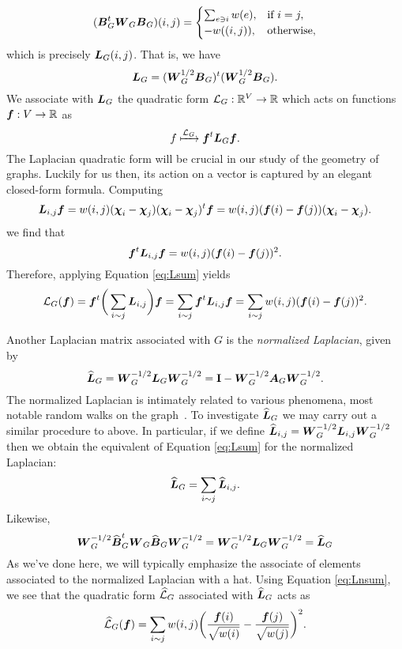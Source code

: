 \begin{align*}
(\vb*{B}_G^t\vb*{W}_G\vb*{B}_G)(i,j) = 
\begin{cases}
\sum_{e\ni i} w(e),&\text{if } i=j,\\
-w((i,j)),&\text{otherwise}, 
\end{cases}
\end{align*}
which is precisely $\vb*{L}_G(i,j)$. That is, we have 
 \begin{equation}
 \label{eq:L=BTB}
 \vb*{L}_G=(\vb*{W}_G^{1/2}\vb*{B}_G)^t(\vb*{W}_G^{1/2}\vb*{B}_G).
 \end{equation}
 We associate with $\vb*{L}_G$ the quadratic form $\mathcal{L}_G:\mathbb{R}^V\to \mathbb{R}$ which acts on functions $\vb*{f}:V\to \mathbb{R}$ as 
\begin{equation*}
 f\xmapsto{\mathcal{L}_G} \vb*{f}^t \vb*{L}_G \vb*{f}.
\end{equation*}
The Laplacian quadratic form will be crucial in our study of the geometry of graphs. Luckily for us then, its action on a vector is captured by an elegant closed-form formula. 
Computing 
\begin{equation*}
    \vb*{L}_{i,j}\vb*{f} = w(i,j)(\boldsymbol{\chi}_i -\boldsymbol{\chi}_j)(\boldsymbol{\chi}_i-\boldsymbol{\chi}_j)^t \vb*{f} = w(i,j)(\vb*{f}(i)-\vb*{f}(j))(\boldsymbol{\chi}_i-\boldsymbol{\chi}_j).
\end{equation*}
we find that 
\[\vb*{f}^t \vb*{L}_{i,j} \vb*{f} = w(i,j)(\vb*{f}(i)-\vb*{f}(j))^2.\]
Therefore, applying Equation \ref{eq:Lsum} yields 
\begin{equation}
\label{eq:Lf}
    \mathcal{L}_G(\vb*{f}) = \vb*{f}^t \bigg(\sum_{i\sim j} \vb*{L}_{i,j}\bigg) \vb*{f} = \sum_{i\sim j}\vb*{f}^t \vb*{L}_{i,j} \vb*{f}= \sum_{i\sim j} w(i,j)(\vb*{f}(i)-\vb*{f}(j))^2.
\end{equation}

Another Laplacian matrix associated with $G$ is the \emph{normalized Laplacian}, given by 
\begin{equation}
\label{eq:Ln_G}
    \widehat{\vb*{L}}_G = \vb*{W}_G^{-1/2} \vb*{L}_G\vb*{W}_G^{-1/2} = \vb{I} - \vb*{W}_G^{-1/2} \vb*{A}_G\vb*{W}_{G}^{-1/2}.
\end{equation} 
The normalized Laplacian is intimately related to various  phenomena, most notable random walks on the graph~\cite{chen2007resistance,chung1997spectral}. To investigate $\widehat{\vb*{L}}_G$ we may carry out a similar procedure to above. In particular, if we define $\widehat{\vb*{L}}_{i,j}=\vb*{W}_G^{-1/2} \vb*{L}_{i,j}\vb*{W}_G^{-1/2}$ then we obtain the equivalent of Equation \ref{eq:Lsum} for the normalized Laplacian:
\begin{equation}
\label{eq:Lnsum}
    \widehat{\vb*{L}}_G = \sum_{i\sim j}\widehat{\vb*{L}}_{i,j}.
\end{equation}
Likewise, 
\begin{equation*}
   \vb*{W}_G^{-1/2}\widehat{\vb*{B}}_G^t \vb*{W}_G\widehat{\vb*{B}}_G\vb*{W}_G^{-1/2} =  \vb*{W}_G^{-1/2}\vb*{L}_G\vb*{W}_G^{-1/2}=\widehat{\vb*{L}}_G
\end{equation*}
As we've done here, we will typically emphasize the associate of elements associated to the normalized Laplacian with a hat.
Using Equation \eqref{eq:Lnsum}, we see that 
the quadratic form $\widehat{\mathcal{L}}_G$ associated with $\widehat{\vb*{L}}_G$ acts as 
\begin{equation}
\label{eq:Lnf}
    \widehat{\mathcal{L}}_G(\vb*{f}) = \sum_{i\sim j} w(i,j)\bigg(\frac{\vb*{f}(i)}{\sqrt{w(i)}}-\frac{\vb*{f}(j)}{\sqrt{w(j)}}\bigg)^2.
\end{equation}




